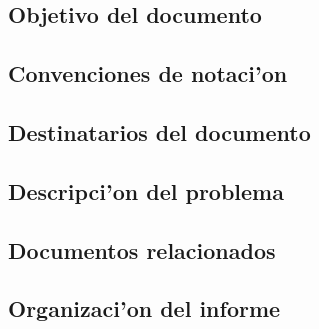 \subsection{ Objetivo del documento	}
\subsection{ Convenciones de notaci'on	}
\subsection{ Destinatarios del documento	}
\subsection{ Descripci'on del problema 	}
\subsection{ Documentos relacionados	}
\subsection{ Organizaci'on del informe	}
